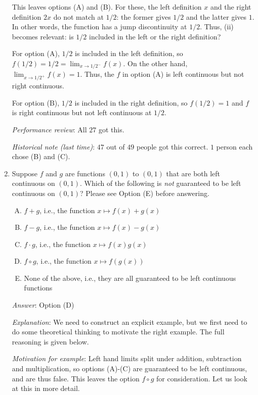 \documentclass[10pt]{amsart}
\begin{document}
\begin{enumerate}
  This leaves options (A) and (B). For these, the left definition $x$
  and the right definition $2x$ do not match at $1/2$: the former
  gives $1/2$ and the latter gives $1$. In other words, the function
  has a jump discontinuity at $1/2$. Thus, (ii) becomes relevant: is
  $1/2$ included in the left or the right definition?

  For option (A), $1/2$ is included in the left definition, so $f(1/2)
  = 1/2 = \displaystyle \lim_{x \to 1/2^-} f(x)$. On the other hand, $\displaystyle \lim_{x \to
  1/2^+} f(x) = 1$. Thus, the $f$ in option (A) is left continuous but
  not right continuous.

  For option (B), $1/2$ is included in the right definition, so
  $f(1/2) = 1$ and $f$ is right continuous but not left continuous at
  $1/2$.

  {\em Performance review}: All $27$ got this.

  {\em Historical note (last time)}: $47$ out of $49$ people got this
  correct. $1$ person each chose (B) and (C).

  
\item Suppose $f$ and $g$ are functions $(0,1)$ to $(0,1)$ that are
  both left continuous on $(0,1)$. Which of the following is {\em not}
  guaranteed to be left continuous on $(0,1)$? Please see Option (E)
  before answering.

  \begin{enumerate}[(A)]
  \item $f + g$, i.e., the function $x \mapsto f(x) + g(x)$
  \item $f - g$, i.e., the function $x \mapsto f(x) - g(x)$
  \item $f \cdot g$, i.e., the function $x \mapsto f(x)g(x)$
  \item $f \circ g$, i.e., the function $x \mapsto f(g(x))$
  \item None of the above, i.e., they are all guaranteed to be left
  continuous functions
  \end{enumerate}

  {\em Answer}: Option (D)

  {\em Explanation}: We need to construct an explicit example, but we
  first need to do some theoretical thinking to motivate the right
  example. The full reasoning is given below.

  {\em Motivation for example}: Left hand limits split under addition,
  subtraction and multiplication, so options (A)-(C) are guaranteed to
  be left continuous, and are thus false. This leaves the option $f
  \circ g$ for consideration. Let us look at this in more detail.


\end{enumerate}
\end{document}
